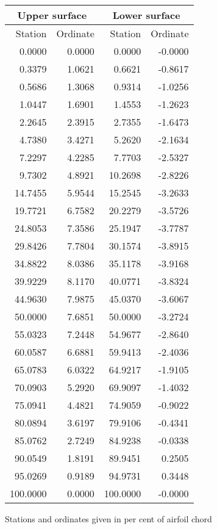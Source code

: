 \documentclass[11pt]{book}
\begin{document}
 \hspace{4mm}
 \begin{tabular}{|r|r|r|r|} \hline 
 \multicolumn{2}{|c|}{Upper surface} & \multicolumn{2}{|c|}{Lower surface} \\
 \hline
 Station & Ordinate & Station & Ordinate \\
 \hline
0.0000 & 0.0000 & 0.0000 & -0.0000 \\
0.3379 & 1.0621 & 0.6621 & -0.8617 \\
0.5686 & 1.3068 & 0.9314 & -1.0256 \\
1.0447 & 1.6901 & 1.4553 & -1.2623 \\
2.2645 & 2.3915 & 2.7355 & -1.6473 \\
4.7380 & 3.4271 & 5.2620 & -2.1634 \\
7.2297 & 4.2285 & 7.7703 & -2.5327 \\
9.7302 & 4.8921 & 10.2698 & -2.8226 \\
14.7455 & 5.9544 & 15.2545 & -3.2633 \\
19.7721 & 6.7582 & 20.2279 & -3.5726 \\
24.8053 & 7.3586 & 25.1947 & -3.7787 \\
29.8426 & 7.7804 & 30.1574 & -3.8915 \\
34.8822 & 8.0386 & 35.1178 & -3.9168 \\
39.9229 & 8.1170 & 40.0771 & -3.8324 \\
44.9630 & 7.9875 & 45.0370 & -3.6067 \\
50.0000 & 7.6851 & 50.0000 & -3.2724 \\
55.0323 & 7.2448 & 54.9677 & -2.8640 \\
60.0587 & 6.6881 & 59.9413 & -2.4036 \\
65.0783 & 6.0322 & 64.9217 & -1.9105 \\
70.0903 & 5.2920 & 69.9097 & -1.4032 \\
75.0941 & 4.4821 & 74.9059 & -0.9022 \\
80.0894 & 3.6197 & 79.9106 & -0.4341 \\
85.0762 & 2.7249 & 84.9238 & -0.0338 \\
90.0549 & 1.8191 & 89.9451 & 0.2505 \\
95.0269 & 0.9189 & 94.9731 & 0.3448 \\
100.0000 & 0.0000 & 100.0000 & -0.0000 \\
 \hline 
 \end{tabular}
 \vspace{8mm}

Stations and ordinates given in per cent of airfoil chord
\end{document}
